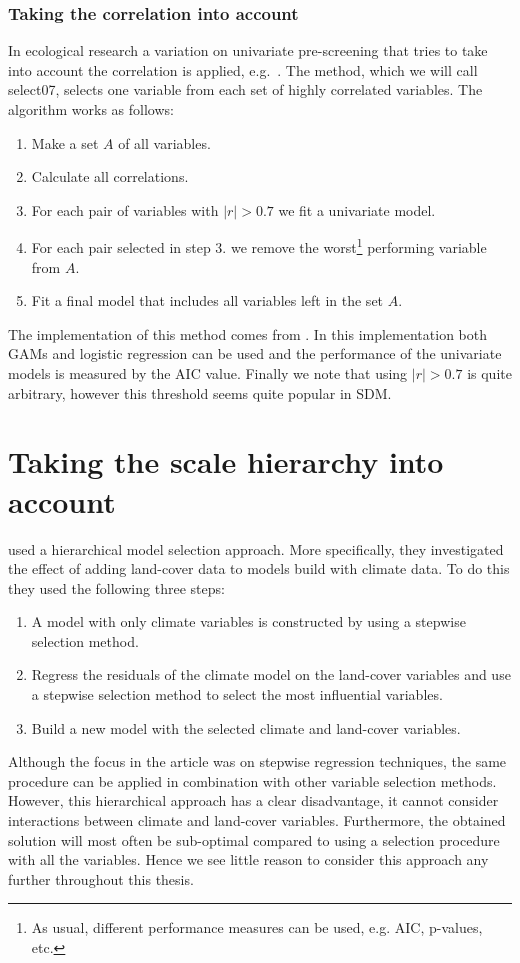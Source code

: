 \subsubsection{Taking the correlation into account}
In ecological research a variation on univariate pre-screening that tries to take into account the correlation is applied, e.g.\ \cite{cord_remote_2014}. The method, which we will call select07, selects one variable from each set of highly correlated variables. The algorithm works as follows:
\begin{enumerate}
\item Make a set $A$ of all variables.
\item Calculate all correlations.
\item For each pair of variables with $|r| > 0.7$ we fit a univariate model.
\item For each pair selected in step 3. we remove the worst\footnote{As usual, different performance measures can be used, e.g. AIC, p-values, etc.} performing variable from $A$.
\item Fit a final model that includes all variables left in the set $A$.
\end{enumerate}
The implementation of this method comes from \cite{dormann_collinearity:_2013}. In this implementation both GAMs and logistic regression can be used and the performance of the univariate models is measured by the AIC value. Finally we note that using $|r| > 0.7$ is quite arbitrary, however this threshold seems quite popular in SDM.

\section{Taking the scale hierarchy into account}
\label{sec:TakingTheScaleHierarchyIntoAccount}
\cite{thuiller_we_2004} used a hierarchical model selection approach. More specifically, they investigated the effect of adding land-cover data to models build with climate data. To do this they used the following three steps:
\begin{enumerate}
\item A model with only climate variables is constructed by using a stepwise selection method.
\item Regress the residuals of the climate model on the land-cover variables and use a stepwise selection method to select the most influential variables.
\item Build a new model with the selected climate and land-cover variables.
\end{enumerate}
Although the focus in the article was on stepwise regression techniques, the same procedure can be applied in combination with other variable selection methods. However, this hierarchical approach has a clear disadvantage, it cannot consider interactions between climate and land-cover variables. Furthermore, the obtained solution will most often be sub-optimal compared to using a selection procedure with all the variables. Hence we see little reason to consider this approach any further throughout this thesis.


